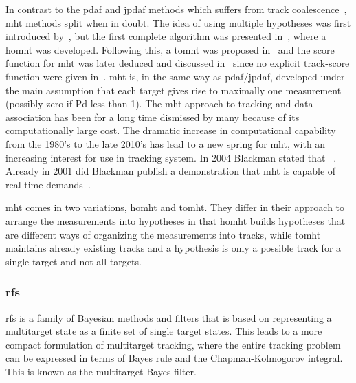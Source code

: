 In contrast to the \gls{pdaf} and \gls{jpdaf} methods which suffers from track \gls{coalescence}~\cite{Fitzgerald1986,Blom2000}, \gls{mht} methods split when in doubt. The idea of using multiple hypotheses was first introduced by~\cite{Singer1974}, but the first complete algorithm was presented in~\cite{Reid1979}, where a \gls{homht} was developed. Following this, a \gls{tomht} was proposed in~\cite{Kurien1990} and the \gls{score} function for \gls{mht} was later deduced and discussed in~\cite{Bar-Shalom2007} since no explicit track-score function were given in~\cite{Kurien1990}. \gls{mht} is, in the same way as \gls{pdaf}/\gls{jpdaf}, developed under the main assumption that each target gives rise to maximally one \gls{measurement} (possibly zero if \gls{Pd} less than 1). The \gls{mht} approach to tracking and data association has been for a long time dismissed by many because of its computationally large cost. The dramatic increase in computational capability from the 1980's to the late 2010's has lead to a new spring for \gls{mht}, with an increasing interest for use in tracking system. In 2004 Blackman stated that ~\cite{Blackman2004}. Already in 2001 did Blackman publish a demonstration that \gls{mht} is capable of real-time demands~\cite{Blackman2001}.

\gls{mht} comes in two variations, \gls{homht} and \gls{tomht}. They differ in their approach to arrange the measurements into hypotheses in that \gls{homht} builds hypotheses that are different ways of organizing the measurements into tracks, while \gls{tomht} maintains already existing tracks and a hypothesis is only a possible track for a single target and not all targets.


\subsubsection{\gls{rfs}}
\Gls{rfs} is a family of Bayesian methods and filters that is based on representing a multitarget state as a finite set of single target states. 
This leads to a more compact formulation of multitarget tracking, where the entire tracking problem can be expressed in terms of Bayes rule and the Chapman-Kolmogorov integral. This is known as the multitarget Bayes filter. 

